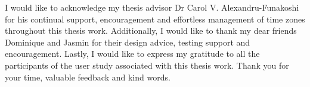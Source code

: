 
\begin{acknowledgements}
I would like to acknowledge my thesis advisor Dr Carol V. Alexandru-Funakoshi
for his continual support, encouragement and effortless management of time
zones throughout this thesis work. Additionally, I would like to thank my dear
friends Dominique and Jasmin for their design advice, testing support and
encouragement. Lastly, I would like to express my gratitude to all the
participants of the user study associated with this thesis work. Thank you for
your time, valuable feedback and kind words.

\end{acknowledgements}
